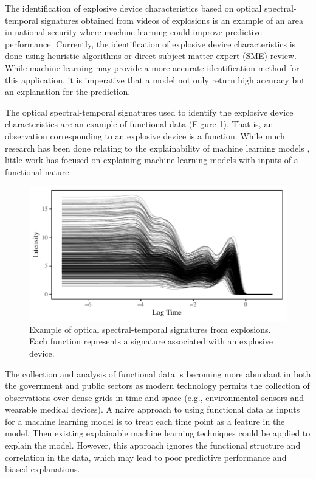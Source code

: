 \documentclass[letterpaper]{article}
\begin{document}
The identification of explosive device characteristics based on optical spectral-temporal signatures obtained from videos of explosions is an example of an area in national security where machine learning could improve predictive performance. Currently, the identification of explosive device characteristics is done using heuristic algorithms or direct subject matter expert (SME) review. While machine learning may provide a more accurate identification method for this application, it is imperative that a model not only return high accuracy but an explanation for the prediction.

The optical spectral-temporal signatures used to identify the explosive device characteristics are an example of functional data (Figure \ref{fig1}). That is, an observation corresponding to an explosive device is a function. While much research has been done relating to the explainability of machine learning models \cite{gilpin:2018,guidotti:2018,hohman:2018,molnar:2019,montavon:2018}, little work has focused on explaining machine learning models with inputs of a functional nature.

\begin{figure}[t]
\centering
\includegraphics[width=.95\columnwidth]{fig1}
\caption{Example of optical spectral-temporal signatures from explosions. Each function represents a signature associated with an explosive device.}
\label{fig1}
\end{figure}

The collection and analysis of functional data is becoming more abundant in both the government and public sectors as modern technology permits the collection of observations over dense grids in time and space (e.g., environmental sensors and wearable medical devices). A naive approach to using functional data as inputs for a machine learning model is to treat each time point as a feature in the model. Then existing explainable machine learning techniques could be applied to explain the model. However, this approach ignores the functional structure and correlation in the data, which may lead to poor predictive performance and biased explanations.
\end{document}
